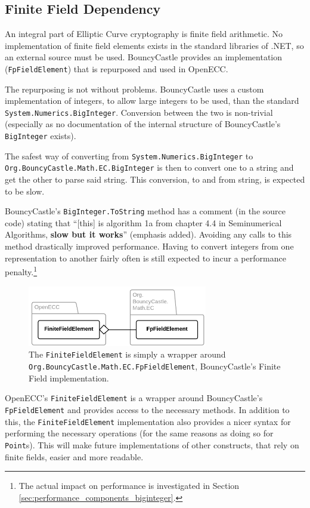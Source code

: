\subsection{Finite Field Dependency}
\label{sec:implementation__dependencies}
\label{sec:implementation_dependency}

An integral part of Elliptic Curve cryptography is finite field arithmetic. No implementation of finite field elements exists
in the standard libraries of .NET, so an external source must be used. BouncyCastle provides an implementation (\texttt{FpFieldElement})
that is repurposed and used in OpenECC.

The repurposing is not without problems. BouncyCastle uses a custom implementation of integers, to allow large integers to
be used, than the standard \texttt{System.Numerics.BigInteger}. Conversion between the two is non-trivial (especially as no documentation
of the internal structure of BouncyCastle's \texttt{BigInteger} exists).

The safest way of converting from \texttt{System.Numerics.BigInteger} to \\
\texttt{Org.BouncyCastle.Math.EC.BigInteger} is then to convert one to a string and get the other to parse said string. This conversion,
to and from string, is expected to be slow.

BouncyCastle's \verb+BigInteger.ToString+ method has a comment (in the source code) stating that ``[this] is algorithm 1a from chapter
4.4 in Seminumerical Algorithms, \textbf{slow but it works}'' (emphasis added). Avoiding any calls to this method drastically improved
performance. Having to convert integers from one representation to another fairly often is still expected to incur a performance
penalty.\footnote{The actual impact on performance is investigated in Section \ref{sec:performance_components_biginteger}.}

\begin{figure}[htb]
	\centering
	\includegraphics[width=0.7\textwidth]{implementation/finitefields}
	\caption{The \texttt{FiniteFieldElement} is simply a wrapper around \texttt{Org.BouncyCastle.Math.EC.FpFieldElement},
		BouncyCastle's Finite Field implementation.}
\end{figure}

OpenECC's \texttt{FiniteFieldElement} is a wrapper around BouncyCastle's \\
\verb+FpFieldElement+ and provides access to the necessary methods.
In addition to this, the \texttt{FiniteFieldElement} implementation also provides a nicer syntax for performing the necessary operations
(for the same reasons as doing so for \texttt{Point}s). This will make future implementations of other constructs, that rely on finite fields,
easier and more readable.